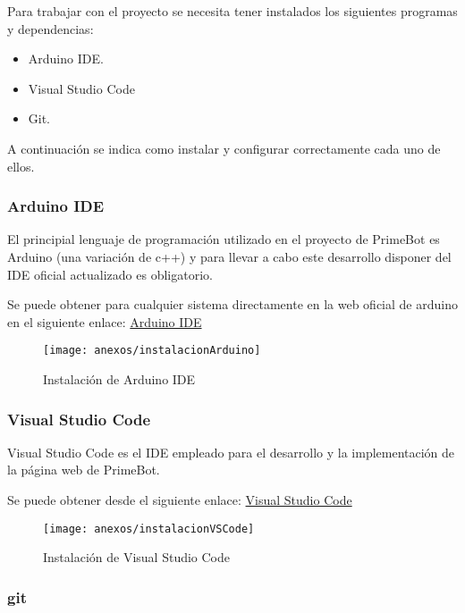 Para trabajar con el proyecto se necesita tener instalados los
siguientes programas y dependencias:

\begin{itemize}
\tightlist
\item
  Arduino IDE.
\item
  Visual Studio Code
\item
  Git.
\end{itemize}

A continuación se indica como instalar y configurar correctamente cada uno de ellos.

\subsubsection{Arduino IDE}\label{arduino-ide}

El principial lenguaje de programación utilizado en el proyecto de PrimeBot es Arduino (una variación de c++) y para llevar a cabo este desarrollo disponer del IDE oficial actualizado es obligatorio.

Se puede obtener para cualquier sistema directamente en la web oficial de arduino en el siguiente enlace: \href{https://www.arduino.cc/en/software}{Arduino IDE}

\begin{figure}[h]
	\centering
	\texttt{[image: anexos/instalacionArduino]}
	\caption{Instalación de Arduino IDE}
	\label{fig:D.1}
\end{figure}

\subsubsection{Visual Studio Code}\label{visual-studio-code}

Visual Studio Code es el IDE empleado para el desarrollo y la implementación de la página web de PrimeBot.

Se puede obtener desde el siguiente enlace: \href{https://code.visualstudio.com/download}{Visual Studio Code}

\begin{figure}[h]
	\centering
	\texttt{[image: anexos/instalacionVSCode]}
	\caption{Instalación de Visual Studio Code}
	\label{fig:D.2}
\end{figure}

\subsubsection{git}\label{git}

